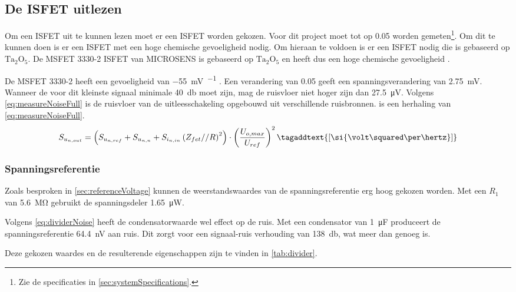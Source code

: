 \subsection{De ISFET uitlezen}
Om een ISFET uit te kunnen lezen moet er een ISFET worden gekozen. Voor dit project moet \si{\pH} tot op \qty{0.05}{\pH} worden gemeten\footnote{Zie de specificaties in \cref{sec:systemSpecifications}.}. Om dit te kunnen doen is er een ISFET met een hoge chemische gevoeligheid nodig. Om hieraan te voldoen is er een ISFET nodig die is gebaseerd op $\mathrm{Ta_2O_5}$. De MSFET 3330-2 ISFET van MICROSENS is gebaseerd op $\mathrm{Ta_2O_5}$ en heeft dus een hoge chemische gevoeligheid \cite{bergveld2003thirtyYearsISFET,bergveld1985impactOfMosfetBasedSensors,isfet}.

De MSFET 3330-2 heeft een gevoeligheid van \qty{-55}{\milli\volt\pH^{-1}} \cite{isfet}. Een verandering van \qty{0.05}{\pH} geeft een spanningsverandering van \qty{2.75}{\milli\volt}. Wanneer de \SNR voor dit kleinste signaal minimale \qty{40}{\decibel} moet zijn, mag de ruisvloer niet hoger zijn dan \qty{27.5}{\micro\volt}. Volgens \cref{eq:measureNoiseFull} is de ruisvloer van de uitleesschakeling opgebouwd uit verschillende ruisbronnen.  is een herhaling van \cref{eq:measureNoiseFull}.
\begin{equation}\label{eq:measureNoiseFull2}
    S_{u_{{n,out}}} = \left(S_{u_{{n,ref}}} + S_{u_{{n,n}}} + S_{i_{{n,in}}}\left(Z_{fet} // R\right)^2\right) \cdot \left(\frac{U_{o,max}}{U_{ref}}\right)^2
    \tagaddtext{[\si{\volt\squared\per\hertz}]}
\end{equation}

\subsubsection{Spanningsreferentie}
Zoals besproken in \cref{sec:referenceVoltage} kunnen de weerstandswaardes van de spanningsreferentie erg hoog gekozen worden. Met een $R_1$ van \qty{5.6}{\mega\ohm} gebruikt de spanningsdeler \qty{1.65}{\micro\watt}.

Volgens \cref{eq:dividerNoise} heeft de condensatorwaarde wel effect op de ruis. Met een condensator van \qty{1}{\micro\farad} produceert de spanningsreferentie \qty{64.4}{\nano\volt} aan ruis. Dit zorgt voor een signaal-ruis verhouding van \qty{138}{\decibel}, wat meer dan genoeg is.

Deze gekozen waardes en de resulterende eigenschappen zijn te vinden in \cref{tab:divider}.

